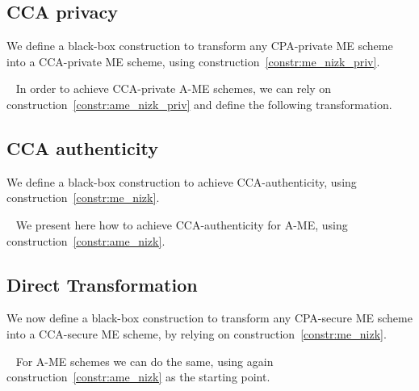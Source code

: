 \subsection{CCA privacy}\label{sec:cca-priv-transformation}
We define a black-box construction to transform any CPA-private ME scheme into a CCA-private ME scheme, using construction~\ref{constr:me_nizk_priv}.

~\newline
In order to achieve CCA-private A-ME schemes, we can rely on construction~\ref{constr:ame_nizk_priv} and define the following transformation.


\subsection{CCA authenticity}\label{sec:cca-auth-transformation}
We define a black-box construction to achieve CCA-authenticity, using construction~\ref{constr:me_nizk}.

~\newline
We present here how to achieve CCA-authenticity for A-ME, using construction~\ref{constr:ame_nizk}.


\subsection{Direct Transformation}\label{sec:cca-full-transformation}
We now define a black-box construction to transform any CPA-secure ME scheme into a CCA-secure ME scheme, by relying on construction~\ref{constr:me_nizk}.

~\newline
For A-ME schemes we can do the same, using again construction~\ref{constr:ame_nizk} as the starting point.


